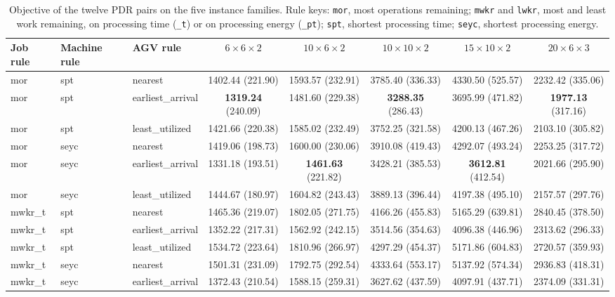 \begin{table}[t]
\centering
\caption{Objective of the twelve PDR pairs on the five instance families.
Rule keys: \texttt{mor}, most operations
remaining; \texttt{mwkr} and \texttt{lwkr}, most and least work remaining, on
processing time (\texttt{\_t}) or on processing energy (\texttt{\_pt});
\texttt{spt}, shortest processing time; \texttt{seyc}, shortest processing energy.}
\label{tab:pdr}
\footnotesize
\renewcommand{\arraystretch}{0.92}
\begin{tabular}{lllccccc}
\toprule
Job rule & Machine rule & AGV rule & $6\times6\times2$ & $10\times6\times2$ & $10\times10\times2$  & $15\times10\times2$ & $20\times6\times3$ \\
\midrule
mor & spt & nearest & 1402.44 (221.90) & 1593.57 (232.91) & 3785.40 (336.33) & 4330.50 (525.57) & 2232.42 (335.06) \\
mor & spt & earliest\_arrival & \textbf{1319.24} (240.09) & 1481.60 (229.38) & \textbf{3288.35} (286.43) & 3695.99 (471.82) & \textbf{1977.13} (317.16) \\
mor & spt & least\_utilized & 1421.66 (220.38) & 1585.02 (232.49) & 3752.25 (321.58) & 4200.13 (467.26) & 2103.10 (305.82) \\
mor & seyc & nearest & 1419.06 (198.73) & 1600.00 (230.06) & 3910.08 (419.43) & 4292.07 (493.24) & 2253.25 (317.72) \\
mor & seyc & earliest\_arrival & 1331.18 (193.51) & \textbf{1461.63} (221.82) & 3428.21 (385.53) & \textbf{3612.81} (412.54) & 2021.66 (295.90) \\
mor & seyc & least\_utilized & 1444.67 (180.97) & 1604.82 (243.43) & 3889.13 (396.44) & 4197.38 (495.10) & 2157.57 (297.76) \\
mwkr\_t & spt & nearest & 1465.36 (219.07) & 1802.05 (271.75) & 4166.26 (455.83) & 5165.29 (639.81) & 2840.45 (378.50) \\
mwkr\_t & spt & earliest\_arrival & 1352.22 (217.31) & 1562.92 (242.15) & 3514.56 (354.63) & 4096.38 (446.96) & 2313.62 (296.33) \\
mwkr\_t & spt & least\_utilized & 1534.72 (223.64) & 1810.96 (266.97) & 4297.29 (454.37) & 5171.86 (604.83) & 2720.57 (359.93) \\
mwkr\_t & seyc & nearest & 1501.31 (231.09) & 1792.75 (292.54) & 4333.64 (553.17) & 5137.92 (574.34) & 2936.83 (418.31) \\
mwkr\_t & seyc & earliest\_arrival & 1372.43 (210.54) & 1588.15 (259.31) & 3627.62 (437.59) & 4097.91 (437.71) & 2374.09 (331.31) \\

\end{tabular}
\end{table}
